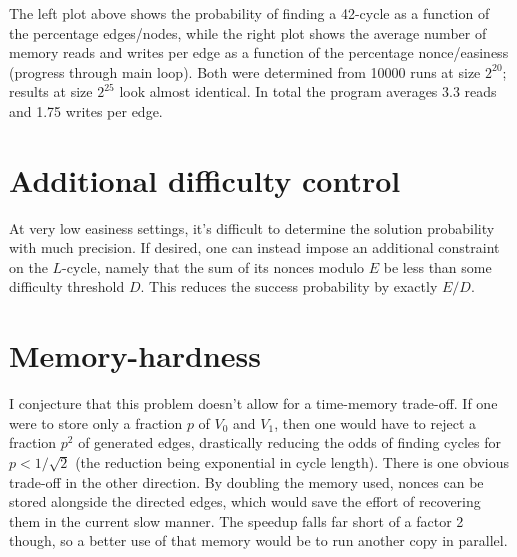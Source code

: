 \documentclass[11pt, oneside]{article}
\begin{document}
\begin{center}
\end{center}

The left plot above shows the probability of finding a 42-cycle as a function of the percentage edges/nodes,
while the right plot shows the average number of memory reads and writes per edge as a function of the percentage
nonce/easiness (progress through main loop). Both were determined from 10000 runs at size $2^{20}$;
results at size $2^{25}$ look almost identical.
In total the program averages 3.3 reads and 1.75 writes per edge.

\section{Additional difficulty control}
At very low easiness settings, it's difficult to determine the solution probability
with much precision. If desired, one can instead impose an additional constraint on the $L$-cycle,
namely that the sum of its nonces modulo $E$ be less than some difficulty threshold $D$.
This reduces the success probability by exactly $E/D$.

\section{Memory-hardness}
I conjecture that this problem doesn't allow for a time-memory trade-off. If
one were to store only a fraction $p$ of $V_0$ and $V_1$, then one would have
to reject a fraction $p^2$ of generated edges, drastically reducing the odds of
finding cycles for $p<1/\sqrt{2}$ (the reduction being exponential in cycle length).
There is one obvious trade-off in the other direction. By doubling the memory
used, nonces can be stored alongside the directed edges, which would save the
effort of recovering them in the current slow manner. The speedup falls far
short of a factor 2 though, so a better use of that memory would be to run
another copy in parallel.
\end{document}
